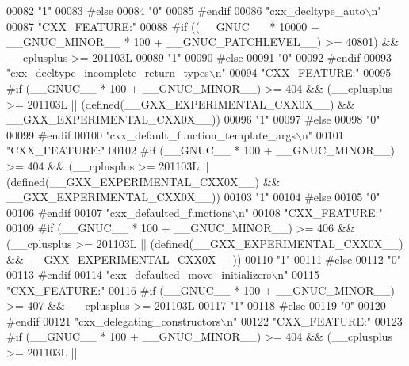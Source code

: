 \begin{DoxyCode}
00082 \textcolor{stringliteral}{"1"}
00083 \textcolor{preprocessor}{#else}
00084 \textcolor{stringliteral}{"0"}
00085 \textcolor{preprocessor}{#endif}
00086 \textcolor{stringliteral}{"cxx\_decltype\_auto\(\backslash\)n"}
00087 \textcolor{stringliteral}{"CXX\_FEATURE:"}
00088 \textcolor{preprocessor}{#if ((\_\_GNUC\_\_ * 10000 + \_\_GNUC\_MINOR\_\_ * 100 + \_\_GNUC\_PATCHLEVEL\_\_) >= 40801) && \_\_cplusplus >= 201103L}
00089 \textcolor{stringliteral}{"1"}
00090 \textcolor{preprocessor}{#else}
00091 \textcolor{stringliteral}{"0"}
00092 \textcolor{preprocessor}{#endif}
00093 \textcolor{stringliteral}{"cxx\_decltype\_incomplete\_return\_types\(\backslash\)n"}
00094 \textcolor{stringliteral}{"CXX\_FEATURE:"}
00095 \textcolor{preprocessor}{#if (\_\_GNUC\_\_ * 100 + \_\_GNUC\_MINOR\_\_) >= 404 && (\_\_cplusplus >= 201103L ||
       (defined(\_\_GXX\_EXPERIMENTAL\_CXX0X\_\_) && \_\_GXX\_EXPERIMENTAL\_CXX0X\_\_))}
00096 \textcolor{stringliteral}{"1"}
00097 \textcolor{preprocessor}{#else}
00098 \textcolor{stringliteral}{"0"}
00099 \textcolor{preprocessor}{#endif}
00100 \textcolor{stringliteral}{"cxx\_default\_function\_template\_args\(\backslash\)n"}
00101 \textcolor{stringliteral}{"CXX\_FEATURE:"}
00102 \textcolor{preprocessor}{#if (\_\_GNUC\_\_ * 100 + \_\_GNUC\_MINOR\_\_) >= 404 && (\_\_cplusplus >= 201103L ||
       (defined(\_\_GXX\_EXPERIMENTAL\_CXX0X\_\_) && \_\_GXX\_EXPERIMENTAL\_CXX0X\_\_))}
00103 \textcolor{stringliteral}{"1"}
00104 \textcolor{preprocessor}{#else}
00105 \textcolor{stringliteral}{"0"}
00106 \textcolor{preprocessor}{#endif}
00107 \textcolor{stringliteral}{"cxx\_defaulted\_functions\(\backslash\)n"}
00108 \textcolor{stringliteral}{"CXX\_FEATURE:"}
00109 \textcolor{preprocessor}{#if (\_\_GNUC\_\_ * 100 + \_\_GNUC\_MINOR\_\_) >= 406 && (\_\_cplusplus >= 201103L ||
       (defined(\_\_GXX\_EXPERIMENTAL\_CXX0X\_\_) && \_\_GXX\_EXPERIMENTAL\_CXX0X\_\_))}
00110 \textcolor{stringliteral}{"1"}
00111 \textcolor{preprocessor}{#else}
00112 \textcolor{stringliteral}{"0"}
00113 \textcolor{preprocessor}{#endif}
00114 \textcolor{stringliteral}{"cxx\_defaulted\_move\_initializers\(\backslash\)n"}
00115 \textcolor{stringliteral}{"CXX\_FEATURE:"}
00116 \textcolor{preprocessor}{#if (\_\_GNUC\_\_ * 100 + \_\_GNUC\_MINOR\_\_) >= 407 && \_\_cplusplus >= 201103L}
00117 \textcolor{stringliteral}{"1"}
00118 \textcolor{preprocessor}{#else}
00119 \textcolor{stringliteral}{"0"}
00120 \textcolor{preprocessor}{#endif}
00121 \textcolor{stringliteral}{"cxx\_delegating\_constructors\(\backslash\)n"}
00122 \textcolor{stringliteral}{"CXX\_FEATURE:"}
00123 \textcolor{preprocessor}{#if (\_\_GNUC\_\_ * 100 + \_\_GNUC\_MINOR\_\_) >= 404 && (\_\_cplusplus >= 201103L ||
}
\end{DoxyCode}
